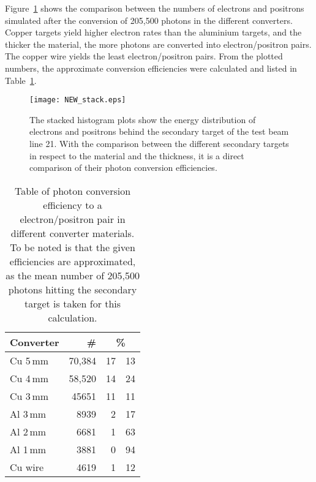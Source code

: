 Figure~\ref{fig:converter_rates} shows the comparison between the numbers of electrons and positrons simulated after the conversion of 205,500 photons in the different converters. Copper targets yield higher electron rates than the aluminium targets, and the thicker the material, the more photons are converted into electron/positron pairs. The copper wire yields the least electron/positron pairs. From the plotted numbers, the approximate conversion efficiencies were calculated and listed in Table~\ref{table:conversion_efficiency}.

\begin{figure}[htbp]
  \centering
  \texttt{[image: NEW\_stack.eps]}
  \caption[Energy distribution of electrons and positrons after photon conversion in different secondary targets of test beam line 21.]{The stacked histogram plots show the energy distribution of electrons and positrons behind the secondary target of the test beam line 21. With the comparison between the different secondary targets in respect to the material and the thickness, it is a direct comparison of their photon conversion efficiencies.}
    \label{fig:converter_rates}
\end{figure}

\begin{table}[htbp]
  \begin{center}
    \begin{tabular}{l r r@{.}l }\toprule
    \textbf{Converter} & \textbf{\#} & \multicolumn{2}{c|}{\textbf{\%}}\\ 
\midrule
    Cu 5\,mm & 70,384 & 17&13\\ 
   
    Cu 4\,mm & 58,520 & 14&24\\ 
 
    Cu 3\,mm & 45651 & 11&11\\

    Al 3\,mm & 8939 & 2&17\\

    Al 2\,mm & 6681 & 1&63\\

    Al 1\,mm & 3881 & 0&94\\
    Cu wire & 4619 & 1&12\\
    \bottomrule
    \end{tabular}
  \end{center}
  \caption[Table of simulated photon conversion efficiencies.]{Table of photon conversion efficiency to a electron/positron pair in different converter materials. To be noted is that the given efficiencies are approximated, as the mean number of 205,500 photons hitting the secondary target is taken for this calculation.}
  \label{table:conversion_efficiency}
\end{table}

